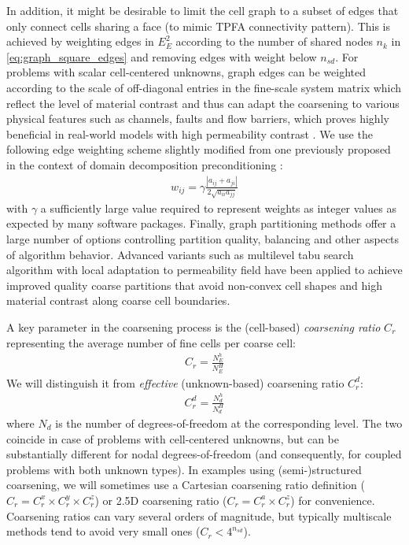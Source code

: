 \begin{itemize}
    In addition, it might be desirable to limit the cell graph to a subset of edges that only connect cells sharing a face (to mimic TPFA connectivity pattern).   This is achieved by weighting edges in $E_E^2$ according to the number of shared nodes $n_k$ in \eqref{eq:graph_square_edges} and removing edges with weight below $n_{sd}$.   For problems with scalar cell-centered unknowns, graph edges can be weighted according to the scale of off-diagonal entries in the fine-scale system matrix which reflect the level of material contrast and thus can adapt the coarsening to various physical features such as channels, faults and flow barriers, which proves highly beneficial in real-world models with high permeability contrast \cite{Klemetsdal2020}.   We use the following edge weighting scheme slightly modified from one previously proposed in the context of domain decomposition preconditioning \cite{Vecharynski2014}:
    \begin{align}
        w_{ij} = \gamma \frac{|a_{ij} + a_{ji}|}{2\sqrt{a_{ii} a_{jj}}} \label{eq:graph_matrix_weights}
    \end{align}
    with $\gamma$ a sufficiently large value required to represent weights as integer values as expected by many software packages.    Finally, graph partitioning methods offer a large number of options controlling partition quality, balancing and other aspects of algorithm behavior.   Advanced variants such as multilevel tabu search algorithm with local adaptation to permeability field \cite{Mehrdoost2019} have been applied to achieve improved quality coarse partitions that avoid non-convex cell shapes and high material contrast along coarse cell boundaries.
\end{itemize}

A key parameter in the coarsening process is the (cell-based) \textit{coarsening ratio} $C_r$ representing the average number of fine cells per coarse cell:
\begin{align}
    C_r = \frac{N_E^h}{N_E^H}
\end{align}
We will distinguish it from \textit{effective} (unknown-based) coarsening ratio $C_r^d$:
\begin{align}
    C_r^d = \frac{N_d^h}{N_d^H}
\end{align}
where $N_d$ is the number of degrees-of-freedom at the corresponding level. The two coincide in case of problems with cell-centered unknowns, but can be substantially different for nodal degrees-of-freedom (and consequently, for coupled problems with both unknown types). In examples using (semi-)structured coarsening, we will sometimes use a Cartesian coarsening ratio definition ($C_r = C_r^x \times C_r^y \times C_r^z$) or 2.5D coarsening ratio ($C_r = C_r^a \times C_r^z$) for convenience. Coarsening ratios can vary several orders of magnitude, but typically multiscale methods tend to avoid very small ones ($C_r < 4^{n_{sd}}$).

